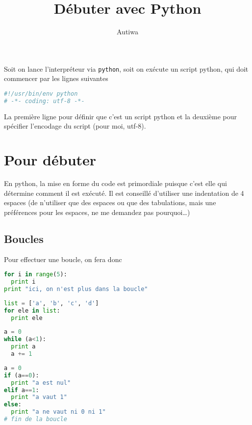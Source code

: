 \documentclass[a4paper,twoside]{article}
\title{Débuter avec Python}
\author{Autiwa}
\begin{document}


\cleardoublepage

\tableofcontents

\cleardoublepage
Soit on lance l'interpréteur via \verb|python|, soit on exécute un script python, qui doit commencer par les lignes suivantes
\begin{lstlisting}[language=python]
#!/usr/bin/env python
# -*- coding: utf-8 -*-
\end{lstlisting}

La première ligne pour définir que c'est un script python et la deuxième pour spécifier l'encodage du script (pour moi, utf-8).

\section{Pour débuter}
En python, la mise en forme du code est primordiale puisque c'est elle qui détermine comment il est exécuté. Il est conseillé d'utiliser une indentation de 4 espaces (de n'utiliser que des espaces ou que des tabulations, mais une préférences pour les espaces, ne me demandez pas pourquoi\dots)

\subsection{Boucles}
Pour effectuer une boucle, on fera donc
\begin{lstlisting}[language=python]
for i in range(5):
  print i
print "ici, on n'est plus dans la boucle"
\end{lstlisting}

\begin{lstlisting}[language=python]
list = ['a', 'b', 'c', 'd']
for ele in list:
  print ele
\end{lstlisting}

\begin{lstlisting}[language=python]
a = 0
while (a<1):
  print a
  a += 1
\end{lstlisting}

\begin{lstlisting}[language=python]
a = 0
if (a==0):
  print "a est nul"
elif a==1:
  print "a vaut 1"
else:
  print "a ne vaut ni 0 ni 1"
# fin de la boucle
\end{lstlisting}
\end{document}
